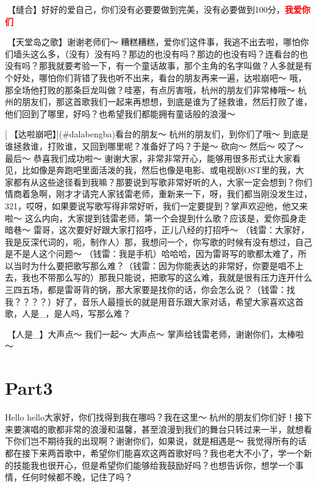 \documentclass[
]{book}
\begin{document}
🎵【缝合】好好的爱自己，你们没有必要要做到完美，没有必要做到100分，\textbf{\textcolor{red}{我爱你们~} }

🎵【天堂岛之歌】谢谢老师们～ 糟糕糟糕，爱你们这件事，我逃不出去啦，哪怕你们墙头这么多，（没有）没有吗？那边的也没有吗？那边的也没有吗？连看台的也没有吗？那我就要考验一下，有一个童话故事，那个主角的名字叫做？人多就是有个好处，哪怕你们背错了我也听不出来，看台的朋友再来一遍，达啦崩吧～ 哦，那全场他打败的那条巨龙叫做？哇塞，有点厉害哦，杭州的朋友们非常棒哦～ 杭州的朋友们，那这首歌我们一起来再想想，到底是谁为了拯救谁，然后打败了谁，他们回到了哪里，好吗？也希望我们都能拥有童话般的浪漫～

[🎵【达啦崩吧】](#dalabengba)看台的朋友～ 杭州的朋友们，到你们了哦～ 到底是谁拯救谁，打败谁，又回到哪里呢？准备好了吗？于是～ 砍向～ 然后～ 咬了～ 最后～ 恭喜我们成功啦～
谢谢大家，非常非常开心，能够用很多形式让大家看见，比如像是奔跑吧里面活泼的我，然后也像是电影、或电视剧OST里的我，大家都有从这些途径看到我嘛？那要说到写歌非常好听的人，大家一定会想到？你们情商着急啊，刚才才请完人家钱雷老师，重新来一下，呀，我们都当刚没发生过，321，哎呀，如果要说写歌写得非常好听，我们一定要提到？掌声欢迎他，他又来啦～ 这么内向，大家提到钱雷老师，第一个会提到什么歌？应该是，爱你孤身走暗巷～ 雷哥，这次要好好跟大家打招呼，正儿八经的打招呼～ （钱雷：大家好，我是反深代词的，呃，制作人）那，我想问一个，你写歌的时候有没有想过，自己是不是人这个问题～ （钱雷：我是手机）哈哈哈，因为雷哥写的歌都太难了，所以当时为什么要把歌写那么难？（钱雷：因为你能表达的非常好，你要是唱不上去，我也不带那么写的）那我只能说，把歌写的这么难，我就是很有压力连开什么三四五场，都是雷哥背的锅，那大家要是找你的话，你会怎么说？（钱雷：找我？？？？）好了，音乐人最擅长的就是用音乐跟大家对话，希望大家喜欢这首歌，人是\_，是人吗，写那么难？

🎵【人是\_】大声点～ 我们一起～ 大声点～ 掌声给钱雷老师，谢谢你们，太棒啦～

\section{Part3}\label{hangzhou-20240823-part3}

Hello hello大家好，你们找得到我在哪吗？我在这里～ 杭州的朋友们你们好！接下来要演唱的歌都非常的浪漫和温馨，甚至浪漫到我们的舞台只转过来一半，就想看下你们岂不期待我的出现啊？谢谢你们，如果说，就是相遇是～ 我觉得所有的话都在接下来两首歌中，希望你们能喜欢这两首歌好吗？我也老大不小了，学一个新的技能我也很开心，但是希望你们能够给我鼓励好吗？也想告诉你，想学一个事情，任何时候都不晚，记住了吗？
\end{document}
